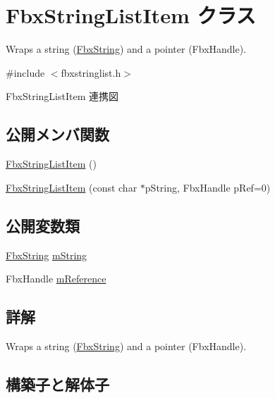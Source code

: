 \hypertarget{class_fbx_string_list_item}{}\section{Fbx\+String\+List\+Item クラス}
\label{class_fbx_string_list_item}


Wraps a string (\hyperlink{class_fbx_string}{Fbx\+String}) and a pointer (Fbx\+Handle).  




{\ttfamily \#include $<$fbxstringlist.\+h$>$}



Fbx\+String\+List\+Item 連携図
\subsection*{公開メンバ関数}
\begin{DoxyCompactItemize}
\item 
\hyperlink{class_fbx_string_list_item_a88e0c20fc1919b27a7b7f5ebea2e983b}{Fbx\+String\+List\+Item} ()
\item 
\hyperlink{class_fbx_string_list_item_ab9247b85347d2525b72f67a6ca38b111}{Fbx\+String\+List\+Item} (const char $\ast$p\+String, Fbx\+Handle p\+Ref=0)
\end{DoxyCompactItemize}
\subsection*{公開変数類}
\begin{DoxyCompactItemize}
\item 
\hyperlink{class_fbx_string}{Fbx\+String} \hyperlink{class_fbx_string_list_item_ad084a731438913ea4a34dff1e4652fde}{m\+String}
\item 
Fbx\+Handle \hyperlink{class_fbx_string_list_item_a97c2d888afeccc13053b187d64351417}{m\+Reference}
\end{DoxyCompactItemize}


\subsection{詳解}
Wraps a string (\hyperlink{class_fbx_string}{Fbx\+String}) and a pointer (Fbx\+Handle). 

\subsection{構築子と解体子}
\mbox{\label{class_fbx_string_list_item_a88e0c20fc1919b27a7b7f5ebea2e983b}} 
